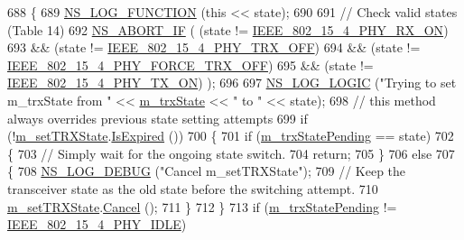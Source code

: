 \begin{DoxyCode}
688 \{
689   \hyperlink{log-macros-disabled_8h_a90b90d5bad1f39cb1b64923ea94c0761}{NS\_LOG\_FUNCTION} (\textcolor{keyword}{this} << state);
690 
691   \textcolor{comment}{// Check valid states (Table 14)}
692   \hyperlink{group__fatal_ga979468222aa80366c2c98aa1554f3eec}{NS\_ABORT\_IF} ( (state != \hyperlink{group__lr-wpan_gga6494269d13d45c511a07b7ccbb1de754a9480f69fea1a74b7961ed74d6b3e2f9e}{IEEE\_802\_15\_4\_PHY\_RX\_ON})
693                 && (state != \hyperlink{group__lr-wpan_gga6494269d13d45c511a07b7ccbb1de754a4c0fd3882b68301deb8ce5b03109058f}{IEEE\_802\_15\_4\_PHY\_TRX\_OFF})
694                 && (state != \hyperlink{group__lr-wpan_gga6494269d13d45c511a07b7ccbb1de754a878a570a6caffa060865d60b3f92cc09}{IEEE\_802\_15\_4\_PHY\_FORCE\_TRX\_OFF})
695                 && (state != \hyperlink{group__lr-wpan_gga6494269d13d45c511a07b7ccbb1de754aa595d552b56b89b363b800b9fcfbe67f}{IEEE\_802\_15\_4\_PHY\_TX\_ON}) );
696 
697   \hyperlink{group__logging_ga88acd260151caf2db9c0fc84997f45ce}{NS\_LOG\_LOGIC} (\textcolor{stringliteral}{"Trying to set m\_trxState from "} << \hyperlink{classns3_1_1LrWpanPhy_a316704a4eb96e04f4b960ba3577fe0ce}{m\_trxState} << \textcolor{stringliteral}{" to "} << state);
698   \textcolor{comment}{// this method always overrides previous state setting attempts}
699   \textcolor{keywordflow}{if} (!\hyperlink{classns3_1_1LrWpanPhy_a0b82e7f96d0225c83489cf3dfb6058ce}{m\_setTRXState}.\hyperlink{classns3_1_1EventId_a5c30c92e7c1c34b4e8505cc07ed71b02}{IsExpired} ())
700     \{
701       \textcolor{keywordflow}{if} (\hyperlink{classns3_1_1LrWpanPhy_a84647014f5242767e3358a6a851c81a7}{m\_trxStatePending} == state)
702         \{
703           \textcolor{comment}{// Simply wait for the ongoing state switch.}
704           \textcolor{keywordflow}{return};
705         \}
706       \textcolor{keywordflow}{else}
707         \{
708           \hyperlink{group__logging_ga413f1886406d49f59a6a0a89b77b4d0a}{NS\_LOG\_DEBUG} (\textcolor{stringliteral}{"Cancel m\_setTRXState"});
709           \textcolor{comment}{// Keep the transceiver state as the old state before the switching attempt.}
710           \hyperlink{classns3_1_1LrWpanPhy_a0b82e7f96d0225c83489cf3dfb6058ce}{m\_setTRXState}.\hyperlink{classns3_1_1EventId_a993ae94e48e014e1afd47edb16db7a11}{Cancel} ();
711         \}
712     \}
713   \textcolor{keywordflow}{if} (\hyperlink{classns3_1_1LrWpanPhy_a84647014f5242767e3358a6a851c81a7}{m\_trxStatePending} != \hyperlink{group__lr-wpan_gga6494269d13d45c511a07b7ccbb1de754af3994414efcd2fac7e312ecb9b3ebd70}{IEEE\_802\_15\_4\_PHY\_IDLE})

\end{DoxyCode}
